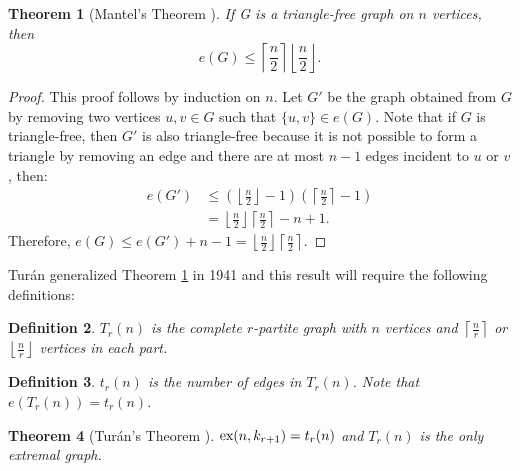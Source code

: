 \documentclass[12pt,twoside,a4paper]{book}
\numberwithin{equation}{section}
\newtheorem{theorem}             {Theorem}[section]
\newtheorem{definition}	[theorem] {Definition}
\theoremstyle{remark}
\def\ex{\mathop{\text{\rm ex}}\nolimits}
\begin{document}
\begin{theorem}[{Mantel's Theorem \cite{Ma07}}]\label{the:mantel}
If G is a triangle-free graph on $n$ vertices, then 
$$e(G) \leq \left\lceil \frac{n}{2} \right\rceil \left\lfloor \frac{n}{2} \right\rfloor .$$
\end{theorem}
\begin{proof}
This proof follows by induction on $n$. Let $G'$ be the graph obtained from $G$ by removing two vertices $u,v \in G$ such that $\{u,v\}\in e(G)$. Note that if $G$ is triangle-free, then $G'$ is also triangle-free because it is not possible to form a triangle by removing an edge and there are at most $n-1$ edges incident to $u$ or $v$, then:
\begin{align*}
e(G') &\leq \left(\left\lfloor \frac{n}{2} \right\rfloor -1\right)\left(\left\lceil \frac{n}{2} \right\rceil -1\right) \\
&= \left\lfloor \frac{n}{2} \right\rfloor \left\lceil \frac{n}{2} \right\rceil - n +1.
\end{align*}
Therefore, $e(G) \leq e(G') + n-1 = \left\lfloor \frac{n}{2} \right\rfloor \left\lceil \frac{n}{2} \right\rceil$. 
\end{proof}

Turán generalized Theorem \ref{the:mantel} in 1941 and this result will require the following definitions: 
\begin{definition}$T_r(n)$ is the complete $r$-partite graph with $n$ vertices and $\left\lceil \frac{n}{r} \right\rceil$ or $\left\lfloor \frac{n}{r} \right\rfloor$ vertices in each part.
\end{definition}

\begin{definition}
$t_r(n)$ is the number of edges in $T_r(n)$. Note that $e(T_r(n)) = t_r(n)$.
\end{definition}

\begin{theorem}[{Turán's Theorem \cite{Tu41}}] \label{theorem:turan1941}%
 $\ex(n, k_{r+1}) = t_r(n)$ and $T_r(n)$ is the only extremal graph.
\end{theorem}
\end{document}
